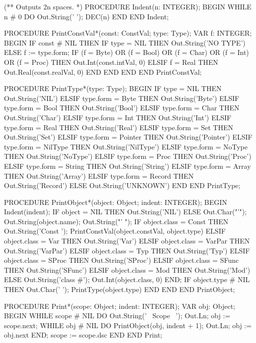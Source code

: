\documentclass[utf8]{lgu}
\begin{document}
\begin{modula2long}
(** Outputs 2n spaces. *)
PROCEDURE Indent(n: INTEGER);
BEGIN
  WHILE n # 0 DO
    Out.String('  ');
    DEC(n)
  END
END Indent;

PROCEDURE PrintConstVal*(const: ConstVal; type: Type);
VAR f: INTEGER;
BEGIN
  IF const # NIL THEN
    IF type = NIL THEN
      Out.String('NO TYPE')
    ELSE
      f := type.form;
      IF (f = Byte) OR (f = Bool) OR (f = Char) OR (f = Int) OR (f = Proc) THEN
        Out.Int(const.intVal, 0)
      ELSIF f = Real THEN
        Out.Real(const.realVal, 0)
      END
    END
  END
END PrintConstVal;

PROCEDURE PrintType*(type: Type);
BEGIN
  IF     type = NIL          THEN Out.String('NIL')
  ELSIF type.form = Byte    THEN Out.String('Byte')
  ELSIF type.form = Bool    THEN Out.String('Bool')
  ELSIF type.form = Char    THEN Out.String('Char')
  ELSIF type.form = Int      THEN Out.String('Int')
  ELSIF type.form = Real    THEN Out.String('Real')
  ELSIF type.form = Set     THEN Out.String('Set')
  ELSIF type.form = Pointer THEN Out.String('Pointer')
  ELSIF type.form = NilType THEN Out.String('NilType')
  ELSIF type.form = NoType  THEN Out.String('NoType')
  ELSIF type.form = Proc    THEN Out.String('Proc')
  ELSIF type.form = String   THEN Out.String('String')
  ELSIF type.form = Array   THEN Out.String('Array')
  ELSIF type.form = Record  THEN Out.String('Record')
  ELSE Out.String('UNKNOWN')
  END
END PrintType;

PROCEDURE PrintObject*(object: Object; indent: INTEGER);
BEGIN
  Indent(indent);
  IF object = NIL THEN
    Out.String('NIL')
  ELSE
    Out.Char("'"); Out.String(object.name); Out.String("' ");
    IF object.class = Const THEN
      Out.String('Const ');
      PrintConstVal(object.constVal, object.type)
    ELSIF object.class = Var THEN
      Out.String('Var')
    ELSIF object.class = VarPar THEN
      Out.String('VarPar')
    ELSIF object.class = Typ THEN
      Out.String('Typ')
    ELSIF object.class = SProc THEN
      Out.String('SProc')
    ELSIF object.class = SFunc THEN
      Out.String('SFunc')
    ELSIF object.class = Mod THEN
      Out.String('Mod')
    ELSE
      Out.String('class #'); Out.Int(object.class, 0)
    END;
    IF object.type # NIL THEN
      Out.Char(' ');
      PrintType(object.type)
    END
  END
END PrintObject;

PROCEDURE Print*(scope: Object; indent: INTEGER);
VAR obj: Object;
BEGIN
  WHILE scope # NIL DO
    Out.String('~ Scope ~'); Out.Ln;
    obj := scope.next;
    WHILE obj # NIL DO
      PrintObject(obj, indent + 1); Out.Ln;
      obj := obj.next
    END;
    scope := scope.dsc
  END
END Print;


\end{modula2long}
\end{document}
